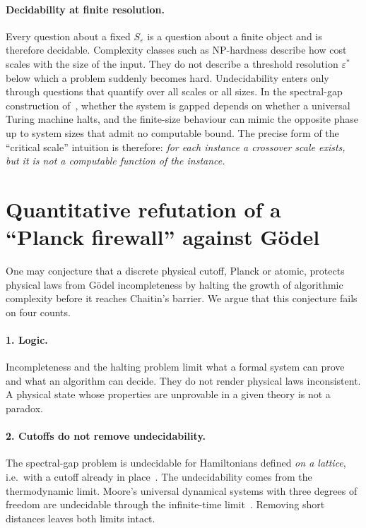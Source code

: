 \documentclass[11pt]{article}
\theoremstyle{definition}\newtheorem{definition}{Definition}[section]
\theoremstyle{remark}\newtheorem*{remark}{Remark}
\begin{document}
\paragraph{Decidability at finite resolution.} Every question about a fixed $S_\varepsilon$ is a question about a
finite object and is therefore decidable. Complexity classes such as NP-hardness describe how cost scales with
the size of the input. They do not describe a threshold resolution $\varepsilon^*$ below which a problem suddenly
becomes hard. Undecidability enters only through questions that quantify over all scales or all sizes. In the
spectral-gap construction of~\cite{CPW}, whether the system is gapped depends on whether a universal Turing
machine halts, and the finite-size behaviour can mimic the opposite phase up to system sizes that admit no
computable bound. The precise form of the ``critical scale'' intuition is therefore: \emph{for each instance a
crossover scale exists, but it is not a computable function of the instance.}

\section{Quantitative refutation of a ``Planck firewall'' against G\"odel}
\label{sec:firewall}

One may conjecture that a discrete physical cutoff, Planck or atomic, protects physical laws from G\"odel
incompleteness by halting the growth of algorithmic complexity before it reaches Chaitin's barrier. We argue
that this conjecture fails on four counts.

\paragraph{1. Logic.} Incompleteness and the halting problem limit what a formal system can prove and what an
algorithm can decide. They do not render physical laws inconsistent. A physical state whose properties are
unprovable in a given theory is not a paradox.

\paragraph{2. Cutoffs do not remove undecidability.} The spectral-gap problem is undecidable for Hamiltonians
defined \emph{on a lattice}, i.e.\ with a cutoff already in place~\cite{CPW}. The undecidability comes from the
thermodynamic limit. Moore's universal dynamical systems with three degrees of freedom are undecidable through
the infinite-time limit~\cite{Moore}. Removing short distances leaves both limits intact.
\end{document}

